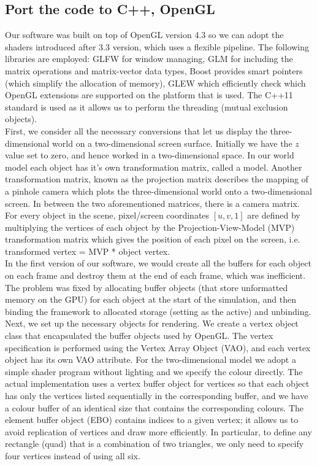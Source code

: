 \documentclass[paper=a4, fontsize=11pt]{scrartcl} %
\numberwithin{equation}{section} %
\numberwithin{figure}{section} %
\numberwithin{table}{section} %
\begin{document}
\subsection{ Port the code to C++, OpenGL}
Our software was built on top of OpenGL version 4.3 so we can adopt the shaders introduced after 3.3 version, which uses a flexible pipeline. The following libraries are employed: GLFW for window managing, GLM  for including the matrix operations and matrix-vector data types, Boost provides smart pointers (which simplify the allocation of memory), GLEW which efficiently check which OpenGL extensions are supported on the platform that is used. The C++11 standard is used as it allows us to perform the threading (mutual exclusion objects). \\

First, we consider all the necessary conversions that let us display the three-dimensional world on a two-dimensional screen surface. Initially we have the \(z\) value set to zero, and hence worked in a two-dimensional space. In our world model each object has it's own transformation matrix, called a model. Another transformation matrix, known as the projection matrix describes the mapping of a pinhole camera which plots the three-dimensional world onto a two-dimensional screen. In between the two aforementioned matrices, there is a camera matrix. For every object in the scene, pixel/screen coordinates \([u, v, 1]\) are defined by multiplying the vertices of each object by the Projection-View-Model (MVP) transformation matrix which gives the position of each pixel on the screen, i.e. transformed vertex = MVP *  object vertex. \\

In the first version of our software, we would create all the buffers for each object on each frame and destroy them at the end of each frame, which was inefficient. The problem was fixed by allocating buffer objects (that store unformatted memory on the GPU) for each object at the start of the simulation, and then binding the framework to allocated storage (setting as the active) and unbinding. \\

Next, we set up the necessary objects for rendering. We create a vertex object class that encapsulated the buffer objects used by OpenGL. The vertex specification is performed using the Vertex Array Object (VAO), and each vertex object has its own VAO attribute. For the two-dimensional model we adopt a simple shader program without lighting and we specify the colour directly. The actual implementation uses a vertex buffer object for vertices so that each object has only the vertices listed sequentially in the corresponding buffer, and we have a colour buffer of an identical size that contains the corresponding colours. The element buffer object (EBO) contains indices to a given vertex; it allows us to avoid replication of vertices and draw more efficiently. In particular, to define any rectangle (quad) that is a combination of two triangles, we only need to specify four vertices instead of using all six. \\
\end{document}
